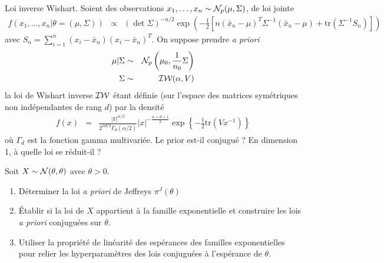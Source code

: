 \documentclass[10pt]{article}
\begin{document}

\fi


\if{} \vspace{1cm}

\if{} \vspace{1cm} 
\begin{exec}{Loi inverse Wishart.}
Soient des observations $x_1,\ldots,x_n\sim{\cal{N}}_p(\mu,\Sigma)$, de loi jointe
\begin{eqnarray*}
f(x_1,\ldots,x_n|\theta=(\mu,\Sigma)) & \propto & \left(\det \Sigma\right)^{-n/2} \exp\left(-\frac{1}{2}\left[n(\bar{x}_n-\mu)^T \Sigma^{-1} (\bar{x}_n-\mu) + \mbox{tr}(\Sigma^{-1} S_n)\right]\right)
\end{eqnarray*}
avec $S_n=\sum_{i=1}^n (x_i-\bar{x}_n)(x_i-\bar{x}_n)^T$. 
On suppose prendre {\it a priori}
\begin{eqnarray*}
\mu|\Sigma & \sim & {\cal{N}}_p\left(\mu_0,\frac{1}{n_0}\Sigma\right) \\
\Sigma & \sim & {\cal{IW}}(\alpha,V) 
\end{eqnarray*} 
la loi de Wishart inverse ${\cal{IW}}$ étant définie (sur l'espace des matrices symétriques non indépendantes de rang $d$) par la densité
\begin{eqnarray*}
f(x) & = & \frac{|V|^{\alpha/2}}{2^{\alpha d/2} \Gamma_d(\alpha/2)} |x|^{-\frac{\alpha+d+1}{2}} \exp\left\{-\frac{1}{2} \text{tr}\left(V x^{-1}\right)\right\}
\end{eqnarray*}
où $\Gamma_d$ est la fonction gamma multivariée. Le prior est-il conjugué ? En dimension 1, à quelle loi se réduit-il ?
\end{exec}


\fi

\if{} \vspace{1cm}
\begin{exec}
Soit $X\sim {\cal{N}}(\theta,\theta)$ avec $\theta>0$. 
\begin{enumerate}
\item Déterminer la loi {\it a priori} de Jeffreys $\pi^J(\theta)$
\item \'Etablir si la loi de $X$ appartient à la famille exponentielle et construire les lois {\it a priori} conjuguées sur $\theta$.
\item Utiliser la propriété de linéarité des espérances des familles exponentielles pour relier les hyperparamètres des lois conjuguées à l'espérance de $\theta$.
\end{enumerate}
\end{exec}
\end{document}
